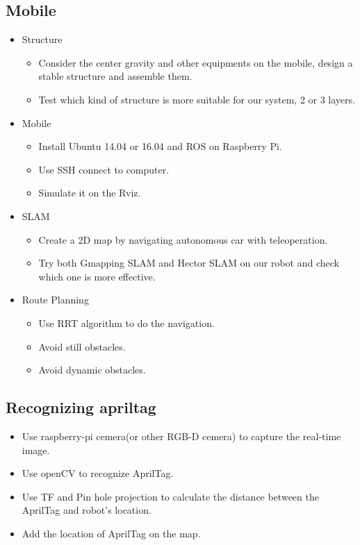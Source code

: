 \documentclass[a4paper, 10pt, conference]{ieeeconf}      %
\begin{document}
\subsection{Mobile}
\begin{itemize}
\item Structure
\begin{itemize}
	\item Consider the center gravity and other equipments on the mobile, design a stable structure and assemble them.
	\item Test which kind of structure is more suitable for our system, 2 or 3 layers.
\end{itemize}

\item Mobile
\begin{itemize}
	\item Install Ubuntu 14.04 or 16.04 and ROS on Raspberry Pi.
	\item Use SSH connect to computer.
	\item Simulate it on the Rviz.
\end{itemize}

\item SLAM
\begin{itemize}
	\item Create a 2D map by navigating autonomous car with teleoperation.
	\item Try both Gmapping SLAM and Hector SLAM on our robot and check which one is more effective.
\end{itemize}

\item Route Planning
\begin{itemize}
	\item Use RRT algorithm to do the navigation.
	\item Avoid still obstacles.
	\item Avoid dynamic obstacles.
\end{itemize}
\end{itemize}

\subsection{Recognizing apriltag}
\begin{itemize}
\item Use raspberry-pi cemera(or other RGB-D cemera) to capture the real-time image.
\item Use openCV to recognize AprilTag.
\item Use TF and Pin hole projection to calculate the distance between the AprilTag and robot's location.
\item Add the location of AprilTag on the map.
\end{itemize}
\end{document}
